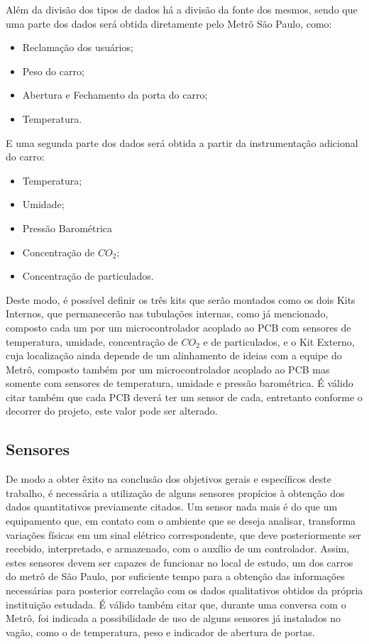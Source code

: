 \documentclass[acronym,symbols]{fei}
\begin{document}
Além da divisão dos tipos de dados há a divisão da fonte dos mesmos, sendo que uma parte dos dados será obtida diretamente pelo Metrô São Paulo, como:
\begin{itemize}
    \item Reclamação dos usuários;
    \item Peso do carro;
    \item Abertura e Fechamento da porta do carro;
    \item Temperatura.
\end{itemize}    
E uma segunda parte dos dados será obtida a partir da instrumentação adicional do carro:
\begin{itemize}
    \item Temperatura;   
    \item Umidade; 
    \item Pressão Barométrica
    \item Concentração de $CO_2$;  
    \item Concentração de particulados.
\end{itemize}    

Deste modo, é possível definir os três kits que serão montados como os dois Kits Internos, que permanecerão nas tubulações internas, como já mencionado, composto cada um por um microcontrolador acoplado ao PCB com sensores de temperatura, umidade, concentração de $CO_2$ e de particulados, e o Kit Externo, cuja localização ainda depende de um alinhamento de ideias com a equipe do Metrô, composto também por um microcontrolador acoplado ao PCB mas somente com sensores de temperatura, umidade e pressão barométrica. É válido citar também que cada PCB deverá ter um sensor de cada, entretanto conforme o decorrer do projeto, este valor pode ser alterado. 

\subsection{Sensores} \label{sensor}

De modo a obter êxito na conclusão dos objetivos gerais e específicos deste trabalho, é necessária a utilização de alguns sensores propícios à obtenção dos dados quantitativos previamente citados. Um sensor nada mais é do que um equipamento que, em contato com o ambiente que se deseja analisar, transforma variações físicas em um sinal elétrico correspondente, que deve posteriormente ser recebido, interpretado, e armazenado, com o auxílio de um controlador. Assim, estes sensores devem ser capazes de funcionar no local de estudo, um dos carros do metrô de São Paulo, por suficiente tempo para a obtenção das informações necessárias para posterior correlação com os dados qualitativos obtidos da própria instituição estudada. É válido também citar que, durante uma conversa com o Metrô, foi indicada a possibilidade de uso de alguns sensores já instalados no vagão, como o de temperatura, peso e indicador de abertura de portas.
\end{document}
